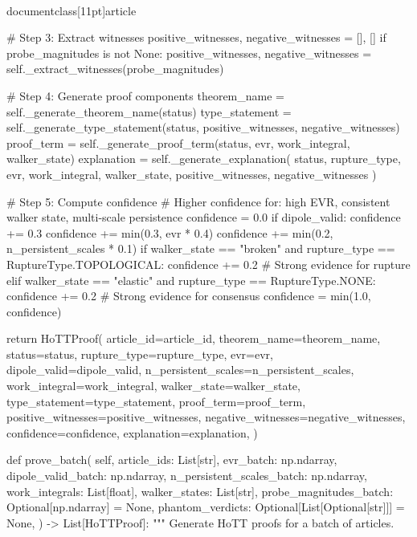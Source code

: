 \\documentclass[11pt]{article}
\begin{document}
\begin{CodeBlock}
        # Step 3: Extract witnesses
        positive_witnesses, negative_witnesses = [], []
        if probe_magnitudes is not None:
            positive_witnesses, negative_witnesses = self._extract_witnesses(probe_magnitudes)

        # Step 4: Generate proof components
        theorem_name = self._generate_theorem_name(status)
        type_statement = self._generate_type_statement(status, positive_witnesses, negative_witnesses)
        proof_term = self._generate_proof_term(status, evr, work_integral, walker_state)
        explanation = self._generate_explanation(
            status, rupture_type, evr, work_integral, walker_state,
            positive_witnesses, negative_witnesses
        )

        # Step 5: Compute confidence
        # Higher confidence for: high EVR, consistent walker state, multi-scale persistence
        confidence = 0.0
        if dipole_valid:
            confidence += 0.3
        confidence += min(0.3, evr * 0.4)
        confidence += min(0.2, n_persistent_scales * 0.1)
        if walker_state == "broken" and rupture_type == RuptureType.TOPOLOGICAL:
            confidence += 0.2  # Strong evidence for rupture
        elif walker_state == "elastic" and rupture_type == RuptureType.NONE:
            confidence += 0.2  # Strong evidence for consensus
        confidence = min(1.0, confidence)

        return HoTTProof(
            article_id=article_id,
            theorem_name=theorem_name,
            status=status,
            rupture_type=rupture_type,
            evr=evr,
            dipole_valid=dipole_valid,
            n_persistent_scales=n_persistent_scales,
            work_integral=work_integral,
            walker_state=walker_state,
            type_statement=type_statement,
            proof_term=proof_term,
            positive_witnesses=positive_witnesses,
            negative_witnesses=negative_witnesses,
            confidence=confidence,
            explanation=explanation,
        )

    def prove_batch(
        self,
        article_ids: List[str],
        evr_batch: np.ndarray,
        dipole_valid_batch: np.ndarray,
        n_persistent_scales_batch: np.ndarray,
        work_integrals: List[float],
        walker_states: List[str],
        probe_magnitudes_batch: Optional[np.ndarray] = None,
        phantom_verdicts: Optional[List[Optional[str]]] = None,
    ) -> List[HoTTProof]:
        """
        Generate HoTT proofs for a batch of articles.


\end{CodeBlock}
\end{document}
